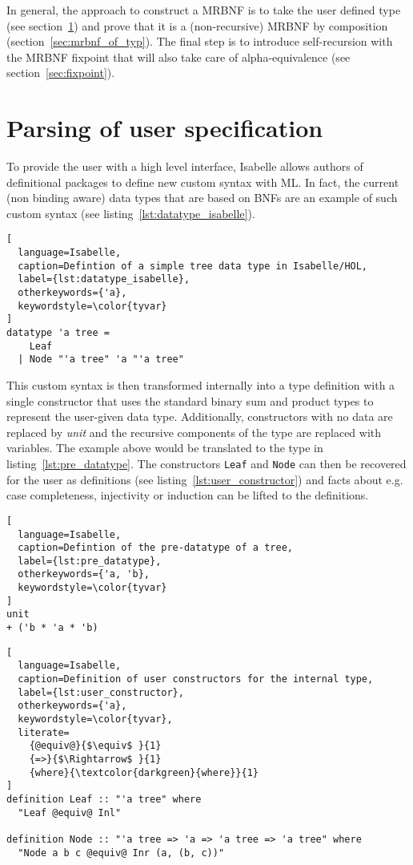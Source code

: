 In general, the approach to construct a \ac{MRBNF} is to take the user defined type (see section~\ref{sec:user_spec}) and prove that it is a (non-recursive) \ac{MRBNF} by composition (section~\ref{sec:mrbnf_of_typ}). The final step is to introduce self-recursion with the \ac{MRBNF} fixpoint that will also take care of alpha-equivalence (see section~\ref{sec:fixpoint}).

\section{Parsing of user specification}\label{sec:user_spec}

To provide the user with a high level interface, Isabelle allows authors of definitional packages to define new custom syntax with ML. In fact, the current (non binding aware) data types that are based on \acp{BNF} are an example of such custom syntax (see listing~\ref{lst:datatype_isabelle}).

\begin{minipage}{\textwidth}
\begin{lstlisting}[
  language=Isabelle,
  caption=Defintion of a simple tree data type in Isabelle/HOL,
  label={lst:datatype_isabelle},
  otherkeywords={'a},
  keywordstyle=\color{tyvar}
]
datatype 'a tree =
    Leaf
  | Node "'a tree" 'a "'a tree"
\end{lstlisting}
\end{minipage}

This custom syntax is then transformed internally into a type definition with a single constructor that uses the standard binary sum and product types to represent the user-given data type. Additionally, constructors with no data are replaced by \textit{unit} and the recursive components of the type are replaced with variables. The example above would be translated to the type in listing~\ref{lst:pre_datatype}. The constructors \texttt{Leaf} and \texttt{Node} can then be recovered for the user as definitions (see listing~\ref{lst:user_constructor}) and facts about e.g. case completeness, injectivity or induction can be lifted to the definitions.

\begin{lstlisting}[
  language=Isabelle,
  caption=Defintion of the pre-datatype of a tree,
  label={lst:pre_datatype},
  otherkeywords={'a, 'b},
  keywordstyle=\color{tyvar}
]
unit
+ ('b * 'a * 'b)
\end{lstlisting}

\begin{lstlisting}[
  language=Isabelle,
  caption=Definition of user constructors for the internal type,
  label={lst:user_constructor},
  otherkeywords={'a},
  keywordstyle=\color{tyvar},
  literate=
    {@equiv@}{$\equiv$ }{1}
    {=>}{$\Rightarrow$ }{1}
    {where}{\textcolor{darkgreen}{where}}{1}
]
definition Leaf :: "'a tree" where
  "Leaf @equiv@ Inl"

definition Node :: "'a tree => 'a => 'a tree => 'a tree" where
  "Node a b c @equiv@ Inr (a, (b, c))"
\end{lstlisting}

